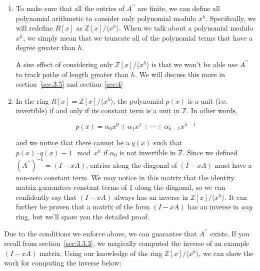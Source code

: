 \documentclass[12pt]{article}
\begin{document}
\begin{enumerate}
    \item To make sure that all the entries of $A^{\prime \prime}$ are finite, we can define all polynomial arithmetic to consider only polynomial modulo $x^h$. Specifically, we will redefine $R[x]$ as $\mathds{Z}[x] / \langle x^h \rangle$. When we talk about a polynomial modulo $x^h$, we simply mean that we truncate all of the polynomial terms that have a degree greater than $h$.

        {\footnotesize A size effect of considering only $\mathds{Z}[x] / \langle x^h \rangle$ is that we won't be able use $A^{\prime \prime}$ to track paths of length greater than $h$. We will discuss this more in section~\ref{sec:3.5} and section~\ref{sec:4}}

    \item In the ring $R[x] = \mathds{Z}[x] / \langle x^h \rangle$, the polynomial $p(x)$ is a unit (i.e. invertible) if and only if its constant term is a unit in $\mathds{Z}$. In other words,

        \[
            p(x) = \alpha_0 x^0 + \alpha_1 x^1 + \cdots + \alpha_{h - 1} x^{h - 1}
        \]

        and we notice that there cannot be a $q(x)$ such that $p(x) \cdot q(x) \equiv 1 \mod x^h$ if $\alpha_0$ is not invertible in $\mathds{Z}$. Since we defined $(A^{\prime \prime})^{-1} = (I - xA)$, entries along the diagonal of $(I - xA)$ must have a non-zero constant term. We may notice in this matrix that the identity matrix guarantees constant terms of 1 along the diagonal, so we can confidently say that $(I - xA)$ always has an inverse in $\mathds{Z}[x] / \langle x^h \rangle$. It can further be proven that a matrix of the form $(I - xA)$ has an inverse in \emph{any} ring, but we'll spare you the detailed proof.
\end{enumerate}

Due to the conditions we enforce above, we can guarantee that $A^{\prime \prime}$ exists. If you recall from section~\ref{sec:3.3.3}, we magically computed the inverse of an example $(I - xA)$ matrix. Using our knowledge of the ring $\mathds{Z}[x] / \langle x^h \rangle$, we can show the work for computing the inverse below:
\end{document}
